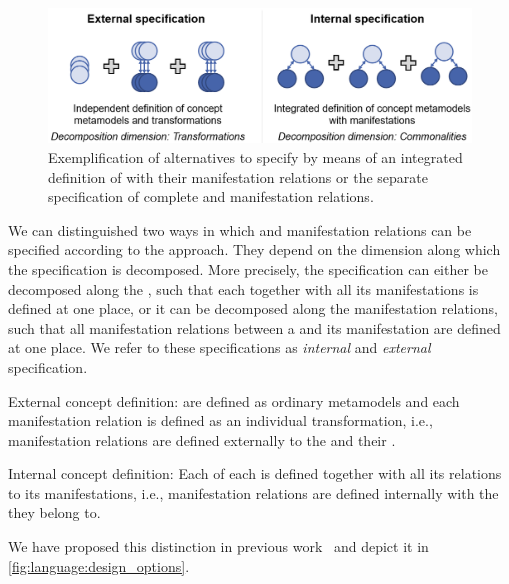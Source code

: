 \begin{figure}
    \centering
    \includegraphics[width=\textwidth]{figures/quality/language/design_options.png}
    \caption[Design options for \commonalities specification]{Exemplification of alternatives to specify \commonalities by means of an integrated definition of \commonalities with their manifestation relations or the separate specification of complete \conceptmetamodels and manifestation relations.}
    \label{fig:language:design_options}
\end{figure}

We can distinguished two ways in which \conceptmetamodels and manifestation relations can be specified according to the \commonalities approach.
They depend on the dimension along which the specification is decomposed.
More precisely, the specification can either be decomposed along the \commonalities, such that each \commonalities together with all its manifestations is defined at one place, or it can be decomposed along the manifestation relations, such that all manifestation relations between a \conceptmetamodel and its manifestation are defined at one place.
We refer to these specifications as \emph{internal} and \emph{external} specification.
\begin{properdescription}
    \item[External concept definition:] \Conceptmetamodels are defined as ordinary metamodels and each manifestation relation is defined as an individual transformation, i.e., manifestation relations are defined externally to the \conceptmetamodels and their \commonalities.
    \item[Internal concept definition:] Each \commonality of each \conceptmetamodel is defined together with all its relations to its manifestations, i.e., manifestation relations are defined internally with the \commonalities they belong to.
\end{properdescription}
We have proposed this distinction in previous work~\cite{klare2019models} and depict it in \autoref{fig:language:design_options}.

